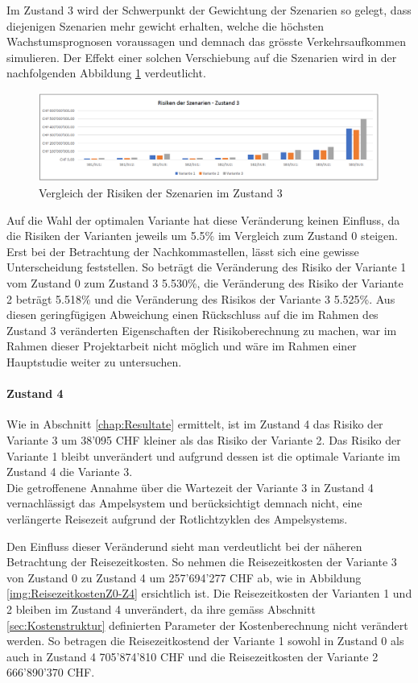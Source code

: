 Im Zustand 3 wird der Schwerpunkt der Gewichtung der Szenarien so gelegt, dass diejenigen Szenarien mehr gewicht erhalten, welche die höchsten Wachstumsprognosen voraussagen und demnach das grösste Verkehrsaufkommen simulieren. Der Effekt einer solchen Verschiebung auf die Szenarien wird in der nachfolgenden Abbildung \ref{img:SzeVer-Z3} verdeutlicht. 

\begin{figure}[h!]
	\centering
	\includegraphics[width=.45\textwidth]{figures/f-06-05-RisikenSzenarienZ3}
	\caption[Szenarienvergleich im Zustand 3]{Vergleich der Risiken der Szenarien im Zustand 3}
	\label{img:SzeVer-Z3}
\end{figure} 

Auf die Wahl der optimalen Variante hat diese Veränderung keinen Einfluss, da die Risiken der Varianten jeweils um 5.5\% im Vergleich zum Zustand 0 steigen. Erst bei der Betrachtung der Nachkommastellen, lässt sich eine gewisse Unterscheidung feststellen. So beträgt die Veränderung des Risiko der Variante 1 vom Zustand 0 zum Zustand 3 5.530\%, die Veränderung des Risiko der Variante 2 beträgt 5.518\% und die Veränderung des Risikos der Variante 3 5.525\%. Aus diesen geringfügigen Abweichung einen Rückschluss auf die im Rahmen des Zustand 3 veränderten Eigenschaften der Risikoberechnung zu machen, war im Rahmen dieser Projektarbeit nicht möglich und wäre im Rahmen einer Hauptstudie weiter zu untersuchen.


\paragraph{Zustand 4} 

Wie in Abschnitt \ref{chap:Resultate} ermittelt, ist im Zustand 4 das Risiko der Variante 3 um 38'095 CHF kleiner als das Risiko der Variante 2. Das Risiko der Variante 1 bleibt unverändert und aufgrund dessen ist die optimale Variante im Zustand 4 die Variante 3. \\
Die getroffenene Annahme über die Wartezeit der Variante 3 in Zustand 4 vernachlässigt das Ampelsystem und berücksichtigt demnach nicht, eine verlängerte Reisezeit aufgrund der Rotlichtzyklen des Ampelsystems. 

Den Einfluss dieser Veränderund sieht man verdeutlicht bei der näheren Betrachtung der Reisezeitkosten. So nehmen die Reisezeitkosten der Variante 3 von Zustand 0 zu Zustand 4 um  257'694'277 CHF ab, wie in Abbildung \ref{img:ReisezeitkostenZ0-Z4} ersichtlich ist. Die Reisezeitkosten der Varianten 1 und 2 bleiben im Zustand 4 unverändert, da ihre gemäss Abschnitt \ref{sec:Kostenstruktur} definierten Parameter der Kostenberechnung nicht verändert werden. So betragen die Reisezeitkostend der Variante 1 sowohl in Zustand 0 als auch in Zustand 4 705'874'810 CHF und die Reisezeitkosten der Variante 2 666'890'370 CHF.


